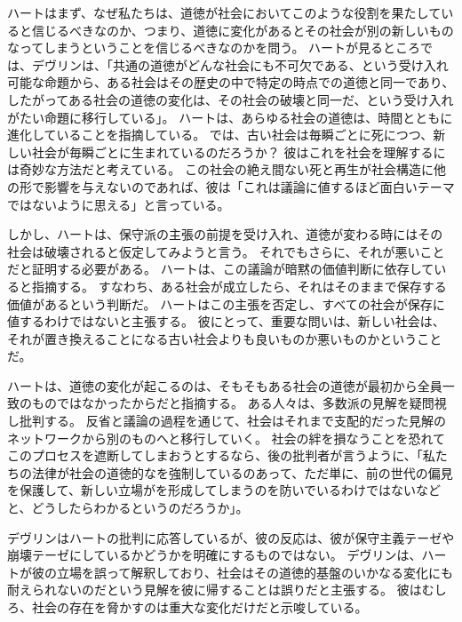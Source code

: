 \documentclass[paper=a4,book,openany]{jlreq}
\newcommand{\ig}[1]{}           %
\begin{document}
ハートはまず、なぜ私たちは、道徳が社会においてこのような役割を果たしていると信じるべきなのか、つまり、道徳に変化があるとその社会が別の新しいものなってしまうということを信じるべきなのかを問う。
ハートが見るところでは、デヴリン\ig{Patrick Devlin}は、「共通の道徳がどんな社会にも不可欠である、という受け入れ可能な命題から、ある社会はその歴史の中で特定の時点での道徳と同一であり、したがってある社会の道徳の変化は、その社会の破壊と同一だ、という受け入れがたい命題に移行している」\citep[p.51--52]{hart63:_law_liber_and_moral}。
ハートは、あらゆる社会の道徳は、時間とともに進化していることを指摘している。
では、古い社会は毎瞬ごとに死につつ、新しい社会が毎瞬ごとに生まれているのだろうか？ 彼はこれを社会を理解するには奇妙な方法だと考えている。
この社会の絶え間ない死と再生が社会構造に他の形で影響を与えないのであれば、彼は「これは議論に値するほど面白いテーマではないように思える」と言っている\citep[p.3]{hart63:_law_liber_and_moral}。

しかし、ハートは、保守派の主張の前提を受け入れ、道徳が変わる時にはその社会は破壊されると仮定してみようと言う。
それでもさらに、それが悪いことだと証明する必要がある。
ハートは、この議論が暗黙の価値判断に依存していると指摘する。
すなわち、ある社会が成立したら、それはそのままで保存する価値があるという判断だ。
ハートはこの主張を否定し、すべての社会が保存に値するわけではないと主張する。
彼にとって、重要な問いは、新しい社会は、それが置き換えることになる古い社会よりも良いものか悪いものかということだ。

ハートは、道徳の変化が起こるのは、そもそもある社会の道徳が最初から全員一致のものではなかったからだと指摘する。
ある人々は、多数派の見解を疑問視し批判する。
反省と議論の過程を通じて、社会はそれまで支配的だった見解のネットワークから別のものへと移行していく。
社会の絆を損なうことを恐れてこのプロセスを遮断してしまおうとするなら、後の批判者が言うように、「私たちの法律が社会の道徳的なを強制しているのあって、ただ単に、前の世代の偏見を保護して、新しい立場がを形成してしまうのを防いでいるわけではないなどと、どうしたらわかるというのだろうか」\citep[p.169]{bix00:_juris}。

デヴリン\ig{Patrick Devlin}はハートの批判に応答しているが、彼の反応は、彼が保守主義テーゼや崩壊テーゼにしているかどうかを明確にするものではない。
デヴリン\ig{Patrick Devlin}は、ハートが彼の立場を誤って解釈しており、社会はその道徳的基盤のいかなる変化にも耐えられないのだという見解を彼に帰することは誤りだと主張する。
彼はむしろ、社会の存在を脅かすのは重大な変化だけだと示唆している。
\end{document}
